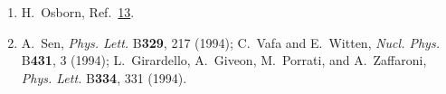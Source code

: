 \begin{enumerate}
  \item {}\label{ch27-ref-20}
  H.~Osborn, Ref.~\hyperref[ch27-ref-13]{13}.

  \item {}\label{ch27-ref-21}
  A.~Sen, \textit{Phys. Lett.} B\textbf{329}, 217 (1994); C.~Vafa and
  E.~Witten, \textit{Nucl. Phys.} B\textbf{431}, 3 (1994);
  L.~Girardello, A.~Giveon, M.~Porrati, and A.~Zaffaroni,
  \textit{Phys. Lett.} B\textbf{334}, 331 (1994).
\end{enumerate}
